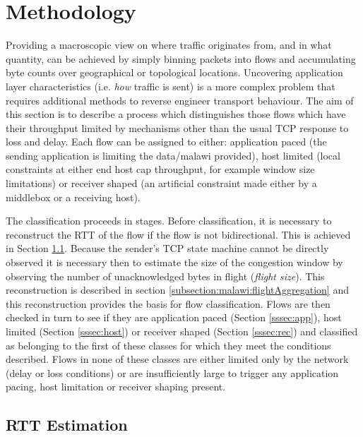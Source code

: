\section{Methodology}

Providing a macroscopic view on where traffic originates from, and in what quantity, can be achieved by simply binning packets into flows and accumulating byte counts over geographical or topological locations. 
Uncovering application layer characteristics (i.e. \textit{how} traffic is sent) is a more complex problem that requires additional methods to reverse engineer transport behaviour.  The aim of this section is to describe a process which distinguishes those flows which have their throughput limited by mechanisms other than the usual TCP response to loss and delay.  Each flow can be assigned to either: application paced (the sending application is limiting the data/malawi provided), host limited (local constraints at either end host cap throughput, for example window size limitations) or receiver shaped (an artificial constraint made either by a middlebox or a receiving host). 

The classification proceeds in stages.  Before classification, it is necessary to reconstruct the RTT of the flow if the flow is not bidirectional.  This is achieved in Section \ref{subsection:malawi:PeriodicEnhancement}.  Because the sender's TCP state machine cannot be directly observed it is necessary then to estimate the size of the congestion window by observing the number of unacknowledged bytes in flight (\textit{flight size}).  This reconstruction is described in section \ref{subsection:malawi:flightAggregation} and this reconstruction provides the basis for flow classification.  Flows are then checked in turn to see if they are application paced (Section \ref{sssec:app}), host limited (Section \ref{sssec:host}) or receiver shaped (Section \ref{sssec:rec}) and classified as belonging to the first of these classes for which they meet the conditions described.   Flows in none of these classes are either limited only by the network (delay or loss conditions) or are insufficiently large to trigger any application 
pacing, 
host limitation or receiver shaping present.

\subsection{RTT Estimation}
\label{subsection:malawi:PeriodicEnhancement}


